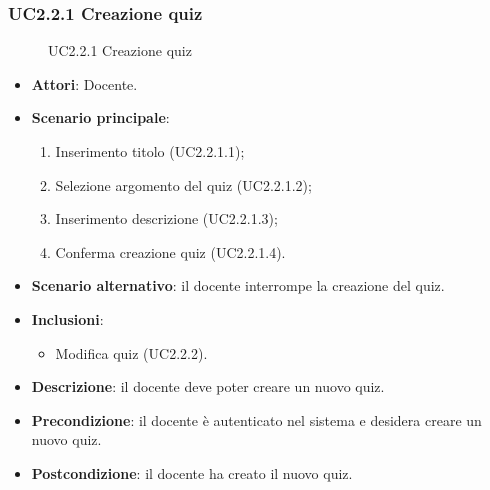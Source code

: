 \subsubsection{UC2.2.1 Creazione quiz}
\begin{figure}[H]
\centering
\noindent{}
\caption{UC2.2.1 Creazione quiz}
\end{figure}
\begin{itemize}
\item \textbf{Attori}: Docente.
\item \textbf{Scenario principale}:
\begin{enumerate}
\item Inserimento titolo (UC2.2.1.1);
\item Selezione argomento del quiz (UC2.2.1.2);
\item Inserimento descrizione (UC2.2.1.3);
\item Conferma creazione quiz (UC2.2.1.4).
\end{enumerate}
\item \textbf{Scenario alternativo}: il docente interrompe la creazione del quiz.
\item \textbf{Inclusioni}:
\begin{itemize}
\item Modifica quiz (UC2.2.2).
\end{itemize}
\item \textbf{Descrizione}: il docente deve poter creare un nuovo quiz.
\item \textbf{Precondizione}: il docente è autenticato nel sistema e desidera creare un nuovo quiz.
\item \textbf{Postcondizione}: il docente ha creato il nuovo quiz.
\end{itemize}
